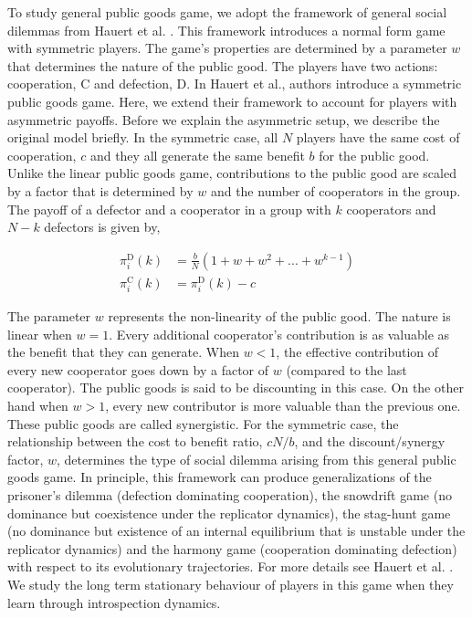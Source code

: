 \documentclass[11pt]{article}
\theoremstyle{plainCl1}
\theoremstyle{plainCl2}
\newcommand{\C}{\mathrm{C}}
\newcommand{\D}{\mathrm{D}}
\begin{document}
To study general public goods game, we adopt the framework of general social dilemmas from Hauert et al. \cite{Hauert:JTB:2006a}. This framework introduces a normal form game with symmetric players. The game's properties are determined by a parameter $w$ that determines the nature of the public good. The players have two actions: cooperation, $\C$ and defection, $\D$. In Hauert et al., authors introduce a symmetric public goods game. Here, we extend their framework to account for players with asymmetric payoffs. Before we explain the asymmetric setup, we describe the original model briefly. In the symmetric case, all $N$ players have the same cost of cooperation, $c$ and they all generate the same benefit $b$ for the public good. Unlike the linear public goods game, contributions to the public good are scaled by a factor that is determined by $w$ and the number of cooperators in the group. The payoff of a defector and a cooperator in a group with $k$ cooperators and $N-k$ defectors is given by, 

\begin{align}
\pi^{\D}_i(k) &= \frac{b}{N}(1 + w + w^2 + ... + w^{k-1}) \\[15pt]
\pi^{\C}_i(k) &= \pi^{\D}_i(k) - c
\label{Eq:payoff-synergistic-symmetric}
\end{align} 

\noindent The parameter $w$ represents the non-linearity of the public good. The nature is linear when $w = 1$. Every additional cooperator's contribution is as valuable as the benefit that they can generate. When $w < 1$, the effective contribution of every new cooperator goes down by a factor of $w$ (compared to the last cooperator). The public goods is said to be discounting in this case. On the other hand when $w > 1$, every new contributor is more valuable than the previous one. These public goods are called synergistic. For the symmetric case, the relationship between the cost to benefit ratio, $cN/b$, and the discount/synergy factor, $w$, determines the type of social dilemma arising from this general public goods game. In principle, this framework can produce generalizations of the prisoner's dilemma (defection dominating cooperation), the snowdrift game (no dominance but coexistence under the replicator dynamics), the stag-hunt game (no dominance but existence of an internal equilibrium that is unstable under the replicator dynamics) and the harmony game (cooperation dominating defection) with respect to its evolutionary trajectories. For more details see Hauert et al. \cite{Hauert:JTB:2006a}. We study the long term stationary behaviour of players in this game when they learn through introspection dynamics. \\ 
\end{document}

